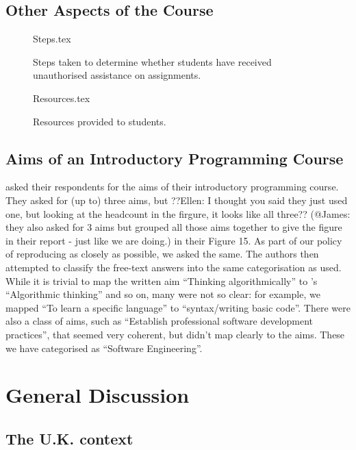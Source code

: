 \documentclass{sig-alternate}
\begin{document}
\subsection{Other Aspects of the Course}

\begin{figure}
\begin{center}
{Steps.tex}
\end{center}
\caption{Steps taken to determine whether students have received unauthorised assistance on assignments.}
\end{figure}

\begin{figure}
\begin{center}
{Resources.tex}
\end{center}
\caption{Resources provided to students.}
\end{figure}
\subsection{Aims of an Introductory Programming Course}
 \cite{mason+cooper:2014} asked their respondents for the aims of their introductory programming course. They asked for (up to) three aims, but ??Ellen: I thought you said they just used one, but looking at the headcount in the firgure, it looks like all three?? (@James: they also asked for 3 aims but grouped all those aims together to give the figure in their report - just like we are doing.) in their Figure 15. As part of our policy of reproducing  \cite{mason+cooper:2014} as closely as possible, we asked the same. The authors then attempted to classify the free-text answers into the same categorisation as  \cite{mason+cooper:2014} used. While it is trivial to map the written aim ``Thinking algorithmically'' to \cite{mason+cooper:2014}'s ``Algorithmic thinking'' and so on, many were not so clear: for example, we mapped ``To learn a specific language'' to ``syntax/writing basic code''. There were also a class of aims, such as ``Establish professional software development practices'', that seemed very coherent, but didn't map clearly to the \cite{mason+cooper:2014} aims. These we have categorised as ``Software Engineering''.

\section{General Discussion}\label{discussion}

\subsection{The U.K. context}
\end{document}
